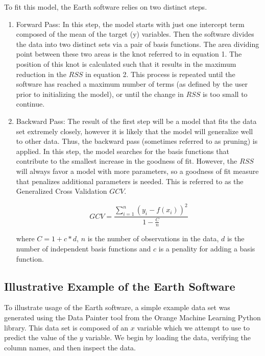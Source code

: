 To fit this model, the Earth software relies on two distinct steps.
\begin{enumerate}


\item Forward Pass: In this step, the model starts with just one intercept term composed of the mean of the target (y) variables. Then the software divides the data into two distinct sets via a pair of basis functions. The area dividing point between these two areas is the knot referred to in equation 1. The position of this knot is calculated such that it results in the maximum reduction in the $RSS$ in equation 2. This process is repeated until the software has reached a maximum number of terms (as defined by the user prior to initializing the model), or until the change in $RSS$ is too small to continue.

\item Backward Pass: The result of the first step will be a model that fits the data set extremely closely, however it is likely that the model will generalize well to other data. Thus, the backward pass (sometimes referred to as pruning) is applied. In this step, the model searches for the basis functions that contribute to the smallest increase in the goodness of fit. However, the $RSS$ will always favor a model with more parameters, so a goodness of fit measure that penalizes additional parameters is needed. This is referred to as the Generalized Cross Validation $GCV$.



\begin{equation}
GCV=\frac{\sum_{i=1}^{n} (y_{i}-f(x_{i}))^{2}}{1-\frac{C}{n}}
\end{equation}

where $C=1+c*d$, $n$ is the number of observations in the data, $d$ is the number of independent basis functions and $c$ is a penality for adding a basis function.
 
\end{enumerate}




\subsection{Illustrative Example of the Earth Software} %

To illustrate usage of the Earth software, a simple example data set was generated using the Data Painter tool from the Orange Machine Learning Python library. This data set is composed of an $x$ variable which we attempt to use to predict the value of the $y$ variable. We begin by loading the data, verifying the column names, and then inspect the data.

